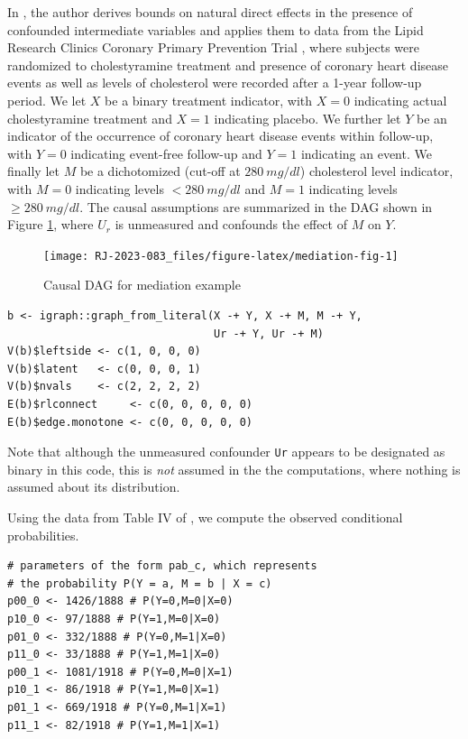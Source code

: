In \citet{sjolandernaturaldirecteffects}, the author derives bounds on natural direct effects in the presence of confounded intermediate variables and applies them to data from the Lipid Research Clinics Coronary Primary Prevention Trial \citep{freedmandata}, where subjects were randomized to cholestyramine treatment and presence of coronary heart disease events as well as levels of cholesterol were recorded after a 1-year follow-up period.
We let \(X\) be a binary treatment indicator, with \(X=0\) indicating actual cholestyramine treatment and \(X=1\) indicating placebo. We further let \(Y\) be an indicator of the occurrence of coronary heart disease events within follow-up, with \(Y=0\) indicating event-free follow-up and \(Y=1\) indicating an event. We finally let \(M\) be a dichotomized (cut-off at \(280\ mg/dl\)) cholesterol level indicator, with \(M=0\) indicating levels \(<280\ mg/dl\) and \(M=1\) indicating levels \(\ge280\ mg/dl\).
The causal assumptions are summarized in the DAG shown in Figure \ref{fig:mediation-fig}, where \(U_r\) is unmeasured and confounds the effect of \(M\) on \(Y\).

\begin{figure}

{\centering \texttt{[image: RJ-2023-083\_files/figure-latex/mediation-fig-1]} 

}

\caption{Causal DAG for mediation example}\label{fig:mediation-fig}
\end{figure}

\begin{verbatim}
b <- igraph::graph_from_literal(X -+ Y, X -+ M, M -+ Y, 
                                Ur -+ Y, Ur -+ M)
V(b)$leftside <- c(1, 0, 0, 0)
V(b)$latent   <- c(0, 0, 0, 1)
V(b)$nvals    <- c(2, 2, 2, 2)
E(b)$rlconnect     <- c(0, 0, 0, 0, 0)
E(b)$edge.monotone <- c(0, 0, 0, 0, 0)
\end{verbatim}

Note that although the unmeasured confounder \texttt{Ur} appears to be designated as binary in this code, this is \emph{not} assumed in the the computations, where nothing is assumed about its distribution.

Using the data from Table IV of \citet{sjolandernaturaldirecteffects}, we compute the observed conditional probabilities.

\begin{verbatim}
# parameters of the form pab_c, which represents 
# the probability P(Y = a, M = b | X = c)
p00_0 <- 1426/1888 # P(Y=0,M=0|X=0)
p10_0 <- 97/1888 # P(Y=1,M=0|X=0)
p01_0 <- 332/1888 # P(Y=0,M=1|X=0)
p11_0 <- 33/1888 # P(Y=1,M=1|X=0)
p00_1 <- 1081/1918 # P(Y=0,M=0|X=1)
p10_1 <- 86/1918 # P(Y=1,M=0|X=1)
p01_1 <- 669/1918 # P(Y=0,M=1|X=1)
p11_1 <- 82/1918 # P(Y=1,M=1|X=1)
\end{verbatim}

